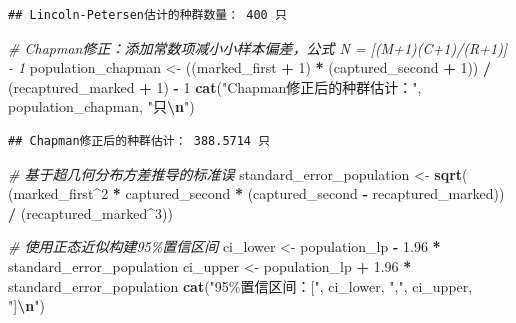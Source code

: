 \documentclass[
  twoside,12pt,fontset=none]{ctexbook}
\newenvironment{Shaded}{\begin{snugshade}}{\end{snugshade}}
\newcommand{\CommentTok}[1]{\textcolor[rgb]{0.56,0.35,0.01}{\textit{#1}}}
\newcommand{\DecValTok}[1]{\textcolor[rgb]{0.00,0.00,0.81}{#1}}
\newcommand{\FloatTok}[1]{\textcolor[rgb]{0.00,0.00,0.81}{#1}}
\newcommand{\FunctionTok}[1]{\textcolor[rgb]{0.13,0.29,0.53}{\textbf{#1}}}
\newcommand{\NormalTok}[1]{#1}
\newcommand{\OtherTok}[1]{\textcolor[rgb]{0.56,0.35,0.01}{#1}}
\newcommand{\SpecialCharTok}[1]{\textcolor[rgb]{0.81,0.36,0.00}{\textbf{#1}}}
\newcommand{\StringTok}[1]{\textcolor[rgb]{0.31,0.60,0.02}{#1}}
\begin{document}
\begin{verbatim}
## Lincoln-Petersen估计的种群数量： 400 只
\end{verbatim}

\begin{Shaded}
\begin{Highlighting}[]
\CommentTok{\# Chapman修正：添加常数项减小小样本偏差，公式 N = [(M+1)(C+1)/(R+1)] {-} 1}
\NormalTok{population\_chapman }\OtherTok{\textless{}{-}}\NormalTok{ ((marked\_first }\SpecialCharTok{+} \DecValTok{1}\NormalTok{) }\SpecialCharTok{*}\NormalTok{ (captured\_second }\SpecialCharTok{+} \DecValTok{1}\NormalTok{)) }\SpecialCharTok{/}
\NormalTok{  (recaptured\_marked }\SpecialCharTok{+} \DecValTok{1}\NormalTok{) }\SpecialCharTok{{-}} \DecValTok{1}
\FunctionTok{cat}\NormalTok{(}\StringTok{"Chapman修正后的种群估计："}\NormalTok{, population\_chapman, }\StringTok{"只}\SpecialCharTok{\textbackslash{}n}\StringTok{"}\NormalTok{)}
\end{Highlighting}
\end{Shaded}

\begin{verbatim}
## Chapman修正后的种群估计： 388.5714 只
\end{verbatim}

\begin{Shaded}
\begin{Highlighting}[]
\CommentTok{\# 基于超几何分布方差推导的标准误}
\NormalTok{standard\_error\_population }\OtherTok{\textless{}{-}} \FunctionTok{sqrt}\NormalTok{(}
\NormalTok{  (marked\_first}\SpecialCharTok{\^{}}\DecValTok{2} \SpecialCharTok{*}\NormalTok{ captured\_second }\SpecialCharTok{*}
\NormalTok{   (captured\_second }\SpecialCharTok{{-}}\NormalTok{ recaptured\_marked)) }\SpecialCharTok{/}
\NormalTok{  (recaptured\_marked}\SpecialCharTok{\^{}}\DecValTok{3}\NormalTok{))}

\CommentTok{\# 使用正态近似构建95\%置信区间}
\NormalTok{ci\_lower }\OtherTok{\textless{}{-}}\NormalTok{ population\_lp }\SpecialCharTok{{-}} \FloatTok{1.96} \SpecialCharTok{*}\NormalTok{ standard\_error\_population}
\NormalTok{ci\_upper }\OtherTok{\textless{}{-}}\NormalTok{ population\_lp }\SpecialCharTok{+} \FloatTok{1.96} \SpecialCharTok{*}\NormalTok{ standard\_error\_population}
\FunctionTok{cat}\NormalTok{(}\StringTok{"95\%置信区间：["}\NormalTok{, ci\_lower, }\StringTok{","}\NormalTok{, ci\_upper, }\StringTok{"]}\SpecialCharTok{\textbackslash{}n}\StringTok{"}\NormalTok{)}
\end{Highlighting}
\end{Shaded}
\end{document}
